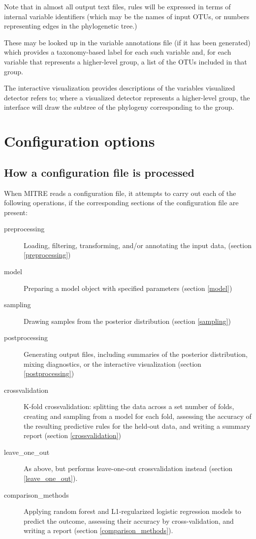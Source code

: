 \documentclass[12pt]{report}
\begin{document}
Note that in almost all output text files, rules will be expressed in
terms of internal variable identifiers (which may be the names of
input OTUs, or numbers representing edges in the phylogenetic tree.)

These may be looked up in the variable annotations file (if it has
been generated) which provides a taxonomy-based label for each such
variable and, for each variable that represents a higher-level group,
a list of the OTUs included in that group.

The interactive visualization provides descriptions of the variables
visualized detector refers to; where a visualized detector represents
a higher-level group, the interface will draw the subtree of the
phylogeny corresponding to the group.

\chapter{Configuration options}\label{configuration}
\section{How a configuration file is processed}
When MITRE reads a configuration file, it attempts
to carry out each of the following operations, if the
corresponding sections of the configuration file are present:

\begin{description}
\item[preprocessing] Loading, filtering, transforming, and/or
  annotating the input data, (section \ref{preprocessing})
\item[model] Preparing a model object with specified
  parameters (section \ref{model})
\item[sampling] Drawing samples from the posterior distribution (section
  \ref{sampling})
\item[postprocessing] Generating output files, including summaries of
  the posterior distribution, mixing diagnostics, or the interactive
  visualization (section \ref{postprocessing})
\item[crossvalidation] K-fold crossvalidation: splitting the data
  across a set number of folds, creating and sampling from a model for
  each fold, assessing the accuracy of the resulting predictive rules
  for the held-out data, and writing a summary report (section \ref{crossvalidation})
\item[leave\_one\_out] As above, but performs leave-one-out
  crossvalidation instead (section \ref{leave_one_out}).
\item[comparison\_methods] Applying random forest and L1-regularized
  logistic regression models to predict the outcome, assessing their
  accuracy by cross-validation, and writing a report (section
  \ref{comparison_methods}).
\end{description}
\end{document}
